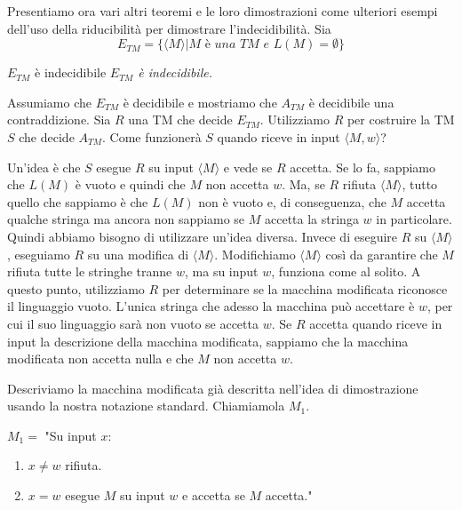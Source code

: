 Presentiamo ora vari altri teoremi e le loro dimostrazioni come ulteriori esempi dell'uso della riducibilità per dimostrare l'indecidibilità. Sia
\begin{equation*}
E_{TM} =\{\langle M\rangle| M\textit{ è una TM e }L(M) = \emptyset\}
\end{equation*}

\begin{Thm}{$E_{TM}$ è indecidibile}{}
\textit{$E_{TM}$ è indecidibile.}

\begin{osservation}
Assumiamo che $E_{TM}$ è decidibile e mostriamo che $A_{TM}$ è decidibile una contraddizione. Sia $R$ una TM che decide $E_{TM}$. Utilizziamo $R$ per costruire la TM $S$ che decide $A_{TM}$. Come funzionerà $S$ quando riceve in input $\langle M, w\rangle$?

Un'idea è che $S$ esegue $R$ su input $\langle M \rangle$ e vede se $R$ accetta. Se lo fa, sappiamo che $L(M)$ è vuoto e quindi che $M$ non accetta $w$. Ma, se $R$ rifiuta $\langle M \rangle$, tutto quello che sappiamo è che $L(M)$ non è vuoto e, di conseguenza, che $M$ accetta qualche stringa ma ancora non sappiamo se $M$ accetta la stringa $w$ in particolare. Quindi abbiamo bisogno di utilizzare un'idea diversa. Invece di eseguire $R$ su $\langle M \rangle$, eseguiamo $R$ su una modifica di $\langle M \rangle$. Modifichiamo $\langle M \rangle$ così da garantire che $M$ rifiuta tutte le stringhe tranne $w$, ma su input $w$, funziona come al solito. A questo punto, utilizziamo $R$ per determinare se la macchina modificata riconosce il linguaggio vuoto. L'unica stringa che adesso la macchina può accettare è $w$, per cui il suo linguaggio sarà non vuoto se accetta $w$. Se $R$ accetta quando riceve in input la descrizione della macchina modificata, sappiamo che la macchina modificata non accetta nulla e che $M$ non accetta $w$.
\end{osservation}

\begin{demonstration}
Descriviamo la macchina modificata già descritta nell'idea di dimostrazione usando la nostra notazione standard. Chiamiamola $M_{1}$.

$M_1 =$ "Su input $x$:
\begin{enumerate}
    \item $x\neq w$ rifiuta.
    \item $x = w$ esegue $M$ su input $w$ e accetta se $M$ accetta."
\end{enumerate}


\end{demonstration}
\end{Thm}
